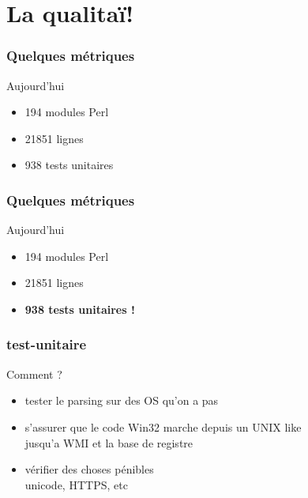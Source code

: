 \documentclass{beamer}
\begin{document}
\section{La qualitaï!}

\begin{frame}
    \frametitle{Quelques métriques}

    \begin{block}{Aujourd'hui}
        \begin{itemize}
            \item 194 modules Perl
            \item 21851 lignes
            \item 938 tests unitaires
        \end{itemize}
    \end{block}

\end{frame}


\begin{frame}
    \frametitle{Quelques métriques}

    \begin{block}{Aujourd'hui}
        \begin{itemize}
            \item 194 modules Perl
            \item 21851 lignes
            \item \bf{938 tests unitaires} !
        \end{itemize}
    \end{block}

\end{frame}

\begin{frame}
    \frametitle{test-unitaire}

    \begin{block}{Comment ?}
        \begin{itemize}
            \item tester le parsing sur des OS qu'on a pas
            \item s'assurer que le code Win32 marche depuis un UNIX like \\
            \small{jusqu'a WMI et la base de registre}
            \item vérifier des choses pénibles \\
            \small{unicode, HTTPS, etc}
        \end{itemize}
    \end{block}

\end{frame}
\end{document}
